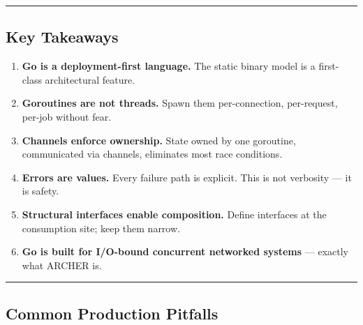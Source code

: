 \documentclass[
]{article}
\providecommand{\tightlist}{%
  \setlength{\itemsep}{0pt}\setlength{\parskip}{0pt}}
\begin{document}
\begin{center}\rule{0.5\linewidth}{0.5pt}\end{center}

\hypertarget{key-takeaways}{%
\subsection{Key Takeaways}\label{key-takeaways}}

\begin{enumerate}
\def\labelenumi{\arabic{enumi}.}
\tightlist
\item
  \textbf{Go is a deployment-first language.} The static binary model is
  a first-class architectural feature.
\item
  \textbf{Goroutines are not threads.} Spawn them per-connection,
  per-request, per-job without fear.
\item
  \textbf{Channels enforce ownership.} State owned by one goroutine,
  communicated via channels, eliminates most race conditions.
\item
  \textbf{Errors are values.} Every failure path is explicit. This is
  not verbosity --- it is safety.
\item
  \textbf{Structural interfaces enable composition.} Define interfaces
  at the consumption site; keep them narrow.
\item
  \textbf{Go is built for I/O-bound concurrent networked systems} ---
  exactly what ARCHER is.
\end{enumerate}

\begin{center}\rule{0.5\linewidth}{0.5pt}\end{center}

\hypertarget{common-production-pitfalls}{%
\subsection{Common Production
Pitfalls}\label{common-production-pitfalls}}
\end{document}
